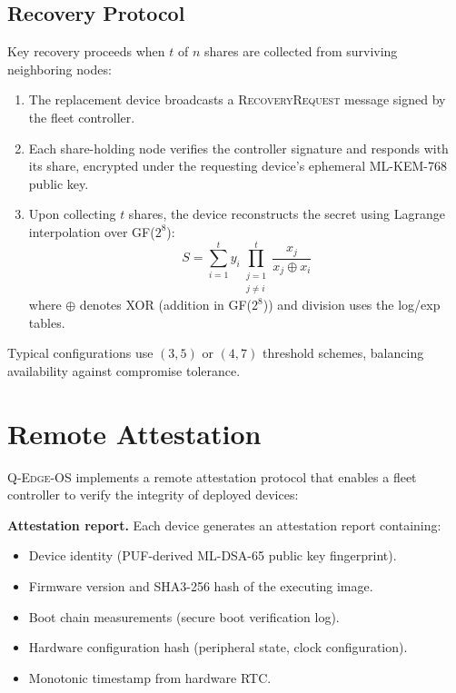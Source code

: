 \documentclass[conference,10pt]{IEEEtran}
\newcommand{\system}{\textsc{Q-Edge-OS}}
\begin{document}
\subsection{Recovery Protocol}

Key recovery proceeds when $t$ of $n$ shares are collected from surviving neighboring nodes:

\begin{enumerate}[leftmargin=*]
  \item The replacement device broadcasts a \textsc{RecoveryRequest} message signed by the fleet controller.
  \item Each share-holding node verifies the controller signature and responds with its share, encrypted under the requesting device's ephemeral ML-KEM-768 public key.
  \item Upon collecting $t$ shares, the device reconstructs the secret using Lagrange interpolation over GF($2^8$):
  $$S = \sum_{i=1}^{t} y_i \prod_{\substack{j=1 \\ j \neq i}}^{t} \frac{x_j}{x_j \oplus x_i}$$
  where $\oplus$ denotes XOR (addition in GF($2^8$)) and division uses the log/exp tables.
\end{enumerate}

Typical configurations use $(3, 5)$ or $(4, 7)$ threshold schemes, balancing availability against compromise tolerance.

\section{Remote Attestation}
\label{sec:attestation}

\system{} implements a remote attestation protocol that enables a fleet controller to verify the integrity of deployed devices:

\textbf{Attestation report.} Each device generates an attestation report containing:
\begin{itemize}[leftmargin=*]
  \item Device identity (PUF-derived ML-DSA-65 public key fingerprint).
  \item Firmware version and SHA3-256 hash of the executing image.
  \item Boot chain measurements (secure boot verification log).
  \item Hardware configuration hash (peripheral state, clock configuration).
  \item Monotonic timestamp from hardware RTC.
\end{itemize}
\end{document}
